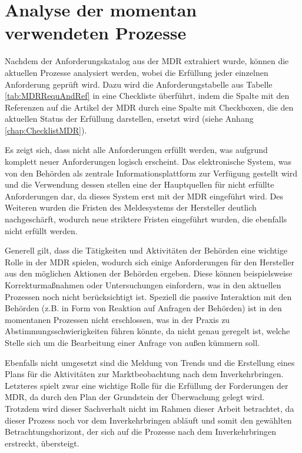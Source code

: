 \documentclass[a4paper,12pt]{report}
\begin{document}
\section{Analyse der momentan verwendeten Prozesse}
Nachdem der Anforderungskatalog aus der MDR extrahiert wurde, können die aktuellen Prozesse analysiert werden, wobei die Erfüllung jeder einzelnen Anforderung geprüft wird. Dazu wird die Anforderungstabelle aus Tabelle \ref{tab:MDRRequAndRef} in eine Checkliste überführt, indem die Spalte mit den Referenzen auf die Artikel der MDR durch eine Spalte mit Checkboxen, die den aktuellen Status der Erfüllung darstellen, ersetzt wird (siehe Anhang \ref{chap:ChecklistMDR}).

Es zeigt sich, dass nicht alle Anforderungen erfüllt werden, was aufgrund komplett neuer Anforderungen logisch erscheint. Das elektronische System, was von den Behörden als zentrale Informationsplattform zur Verfügung gestellt wird und die Verwendung dessen stellen eine der Hauptquellen für nicht erfüllte Anforderungen dar, da dieses System erst mit der MDR eingeführt wird. Des Weiteren wurden die Fristen des Meldesystems der Hersteller deutlich nachgeschärft, wodurch neue striktere Fristen eingeführt wurden, die ebenfalls nicht erfüllt werden. 

Generell gilt, dass die Tätigkeiten und Aktivitäten der Behörden eine wichtige Rolle in der MDR spielen, wodurch sich einige Anforderungen für den Hersteller aus den möglichen Aktionen der Behörden ergeben. Diese können beispielsweise Korrekturmaßnahmen oder Untersuchungen einfordern, was in den aktuellen Prozessen noch nicht berücksichtigt ist. Speziell die passive Interaktion mit den Behörden (z.B. in Form von Reaktion auf Anfragen der Behörden) ist in den momentanen Prozessen nicht erschlossen, was in der Praxis zu Abstimmungsschwierigkeiten führen könnte, da nicht genau geregelt ist, welche Stelle sich um die Bearbeitung einer Anfrage von außen kümmern soll.

Ebenfalls nicht umgesetzt sind die Meldung von Trends und die Erstellung eines Plans für die Aktivitäten zur Marktbeobachtung nach dem Inverkehrbringen. Letzteres spielt zwar eine wichtige Rolle für die Erfüllung der Forderungen der MDR, da durch den Plan der Grundstein der Überwachung gelegt wird. Trotzdem wird dieser Sachverhalt nicht im Rahmen dieser Arbeit betrachtet, da dieser Prozess noch vor dem Inverkehrbringen abläuft und somit den gewählten Betrachtungshorizont, der sich auf die Prozesse nach dem Inverkehrbringen erstreckt, übersteigt.
\end{document}
